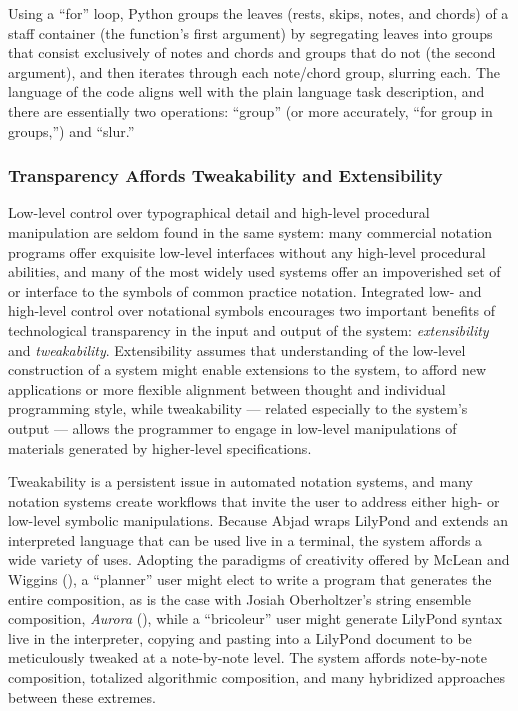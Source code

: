 Using a ``for'' loop, Python groups the leaves (rests, skips, notes, and chords) of a staff container (the function's first argument) by segregating leaves into groups that consist exclusively of notes and chords and groups that do not (the second argument), and then iterates through each note/chord group, slurring each. The language of the code aligns well with the plain language task description, and there are essentially two operations: ``group'' (or more accurately, ``for group in groups,'') and ``slur.'' 

\subsubsection{Transparency Affords Tweakability and Extensibility}

Low-level control over typographical detail and high-level procedural manipulation are seldom found in the same system: many commercial notation programs offer exquisite low-level interfaces without any high-level procedural abilities, and many of the most widely used systems offer an impoverished set of or interface to the symbols of common practice notation. Integrated low- and high-level control over notational symbols encourages two important benefits of technological transparency in the input and output of the system: \emph{extensibility} and \emph{tweakability}. Extensibility assumes that understanding of the low-level construction of a system might enable extensions to the system, to afford new applications or more flexible alignment between thought and individual programming style, while tweakability --- related especially to the system's output --- allows the programmer to engage in low-level manipulations of materials generated by higher-level specifications.

Tweakability is a persistent issue in automated notation systems, and many notation systems create workflows that invite the user to address either high- or low-level symbolic manipulations. Because Abjad wraps LilyPond and extends an interpreted language that can be used live in a terminal, the system affords a wide variety of uses. Adopting the paradigms of creativity offered by McLean and Wiggins (\cite{McLean2010}), a ``planner'' user might elect to write a program that generates the entire composition, as is the case with Josiah Oberholtzer's string ensemble composition, \emph{Aurora} (\cite{Oberholtzer:2010kx}), while a ``bricoleur'' user might generate LilyPond syntax live in the interpreter, copying and pasting into a LilyPond document to be meticulously tweaked at a note-by-note level. The system affords note-by-note composition, totalized algorithmic composition, and many hybridized approaches between these extremes.  

